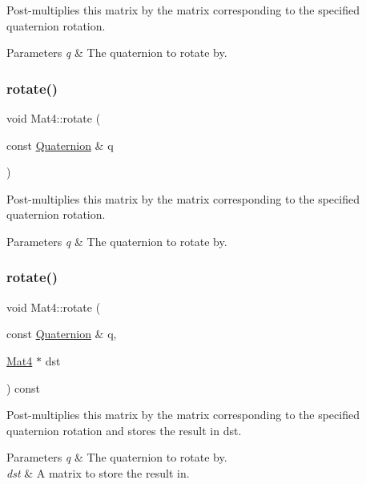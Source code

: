 Post-\/multiplies this matrix by the matrix corresponding to the specified quaternion rotation.


\begin{DoxyParams}{Parameters}
{\em q} & The quaternion to rotate by. \\
\hline
\end{DoxyParams}
\mbox{\label{classMat4_a1cc6787b1cf29ce48df616a6aabe3096}} 
\subsubsection{\texorpdfstring{rotate()}{rotate()}\hspace{0.1cm}{\footnotesize\ttfamily [2/8]}}
{\footnotesize\ttfamily void Mat4\+::rotate (\begin{DoxyParamCaption}\item[{const \hyperlink{classQuaternion}{Quaternion} \&}]{q }\end{DoxyParamCaption})}

Post-\/multiplies this matrix by the matrix corresponding to the specified quaternion rotation.


\begin{DoxyParams}{Parameters}
{\em q} & The quaternion to rotate by. \\
\hline
\end{DoxyParams}
\mbox{\label{classMat4_a638b21eb95ee5240a780562e7099de4c}} 
\subsubsection{\texorpdfstring{rotate()}{rotate()}\hspace{0.1cm}{\footnotesize\ttfamily [3/8]}}
{\footnotesize\ttfamily void Mat4\+::rotate (\begin{DoxyParamCaption}\item[{const \hyperlink{classQuaternion}{Quaternion} \&}]{q,  }\item[{\hyperlink{classMat4}{Mat4} $\ast$}]{dst }\end{DoxyParamCaption}) const}

Post-\/multiplies this matrix by the matrix corresponding to the specified quaternion rotation and stores the result in dst.


\begin{DoxyParams}{Parameters}
{\em q} & The quaternion to rotate by. \\
\hline
{\em dst} & A matrix to store the result in. \\
\hline
\end{DoxyParams}
\mbox{\label{classMat4_a638b21eb95ee5240a780562e7099de4c}} 
